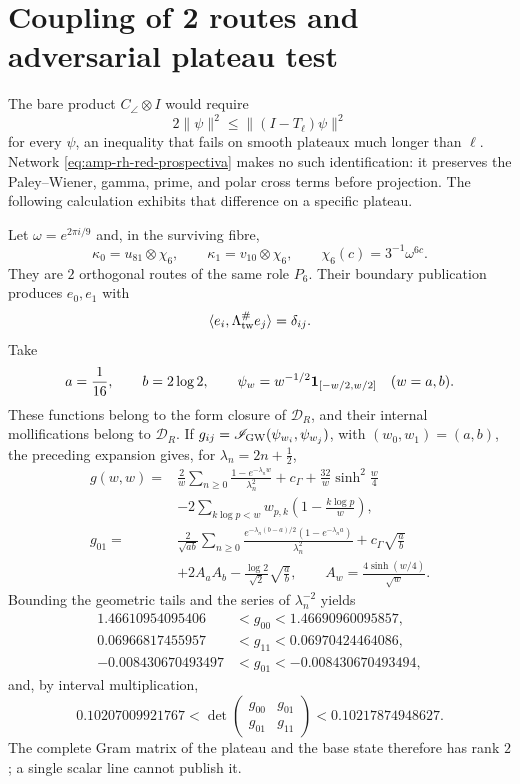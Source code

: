 \section*{Coupling of 2 routes and adversarial plateau test}

The bare product \(C_\angle\otimes I\) would require
\[
 2\|\psi\|^2\leq\|(I-T_\ell)\psi\|^2
\]
for every \(\psi\), an inequality that fails on smooth plateaux much longer than \(\ell\). Network \eqref{eq:amp-rh-red-prospectiva} makes no such identification: it preserves the Paley--Wiener, gamma, prime, and polar cross terms before projection. The following calculation exhibits that difference on a specific plateau.

Let \(\omega=e^{2\pi i/9}\) and, in the surviving fibre,
\[
 \kappa_0=u_{81}\otimes\chi_6,\qquad
 \kappa_1=v_{10}\otimes\chi_6,\qquad
 \chi_6(c)=3^{-1}\omega^{6c}.
\]
They are \(2\) orthogonal routes of the same role \(P_6\). Their boundary publication produces \(e_0,e_1\) with
\[
 \langle e_i,\Lambda_{\rm tw}^{\#}e_j\rangle=\delta_{ij}.
\]
Take
\[
 a=\frac1{16},\qquad b=2\log2,\qquad
 \psi_w=w^{-1/2}{\bf1}_{[-w/2,w/2]}\quad(w=a,b).
\]
These functions belong to the form closure of \(\mathcal D_R\), and their internal mollifications belong to \(\mathcal D_R\). If \(g_{ij}=\mathscr I_{\rm GW}(\psi_{w_i},\psi_{w_j})\), with \((w_0,w_1)=(a,b)\), the preceding expansion gives, for \(\lambda_n=2n+\tfrac12\),
\begin{align}
 g(w,w)
 ={}&\frac2w\sum_{n\geq0}
 \frac{1-e^{-\lambda_nw}}{\lambda_n^2}
 +c_\Gamma+\frac{32}{w}\sinh^2\!\frac w4 \nonumber\\
 &-2\sum_{k\log p<w}
  w_{p,k}\left(1-\frac{k\log p}{w}\right),
 \label{eq:amp-rh-meseta-diagonal}\\
 g_{01}
 ={}&\frac2{\sqrt{ab}}\sum_{n\geq0}
 \frac{e^{-\lambda_n(b-a)/2}(1-e^{-\lambda_na})}{\lambda_n^2}
 +c_\Gamma\sqrt{\frac ab} \nonumber\\
 &+2A_aA_b-\frac{\log2}{\sqrt2}\sqrt{\frac ab},
 \qquad A_w=\frac{4\sinh(w/4)}{\sqrt w}.
 \label{eq:amp-rh-meseta-cruce}
\end{align}
Bounding the geometric tails and the series of \(\lambda_n^{-2}\) yields
\begin{align}
 1.46610954095406&<g_{00}<1.46690960095857,\nonumber\\
 0.06966817455957&<g_{11}<0.06970424464086,\nonumber\\
 -0.008430670493497&<g_{01}<-0.008430670493494,
 \label{eq:amp-rh-meseta-cotas}
\end{align}
and, by interval multiplication,
\begin{equation}\label{eq:amp-rh-meseta-determinante}
 0.10207009921767<
 \det\begin{pmatrix}g_{00}&g_{01}\\g_{01}&g_{11}\end{pmatrix}
 <0.10217874948627.
\end{equation}
The complete Gram matrix of the plateau and the base state therefore has rank \(2\); a single scalar line cannot publish it.

